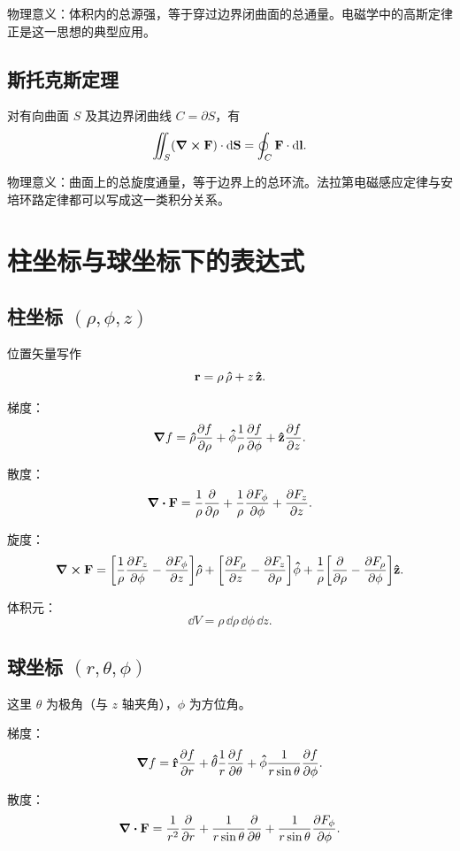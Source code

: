 物理意义：体积内的总源强，等于穿过边界闭曲面的总通量。电磁学中的高斯定律正是这一思想的典型应用。

\subsection{斯托克斯定理}

对有向曲面 $S$ 及其边界闭曲线 $C=\partial S$，有
\[
\iint_S (\curl \vb{F})\cdot \dd \vb{S}=\oint_C \vb{F}\cdot \dd \vb{l}.
\]

物理意义：曲面上的总旋度通量，等于边界上的总环流。法拉第电磁感应定律与安培环路定律都可以写成这一类积分关系。

\section{柱坐标与球坐标下的表达式}

\subsection{柱坐标 $(\rho,\phi,z)$}

位置矢量写作
\[
\vb{r}=\rho\,\vu{\rho}+z\,\vu{z}.
\]

梯度：
\[
\grad f=\vu{\rho}\pdv{f}{\rho}+\vu{\phi}\frac{1}{\rho}\pdv{f}{\phi}+\vu{z}\pdv{f}{z}.
\]

散度：
\[
\div \vb{F}=\frac{1}{\rho}\pdv{}{\rho}(\rho F_{\rho})+\frac{1}{\rho}\pdv{F_{\phi}}{\phi}+\pdv{F_z}{z}.
\]

旋度：
\[
\curl \vb{F}=
\qty[\frac{1}{\rho}\pdv{F_z}{\phi}-\pdv{F_{\phi}}{z}]\vu{\rho}
+\qty[\pdv{F_{\rho}}{z}-\pdv{F_z}{\rho}]\vu{\phi}
+\frac{1}{\rho}\qty[\pdv{}{\rho}(\rho F_{\phi})-\pdv{F_{\rho}}{\phi}]\vu{z}.
\]

体积元：
\[
\dd V=\rho\,\dd\rho\,\dd\phi\,\dd z.
\]

\subsection{球坐标 $(r,\theta,\phi)$}

这里 $\theta$ 为极角（与 $z$ 轴夹角），$\phi$ 为方位角。

梯度：
\[
\grad f=
\vu{r}\pdv{f}{r}
+\vu{\theta}\frac{1}{r}\pdv{f}{\theta}
+\vu{\phi}\frac{1}{r\sin\theta}\pdv{f}{\phi}.
\]

散度：
\[
\div \vb{F}=
\frac{1}{r^2}\pdv{}{r}(r^2 F_r)
+\frac{1}{r\sin\theta}\pdv{}{\theta}(\sin\theta\,F_{\theta})
+\frac{1}{r\sin\theta}\pdv{F_{\phi}}{\phi}.
\]

